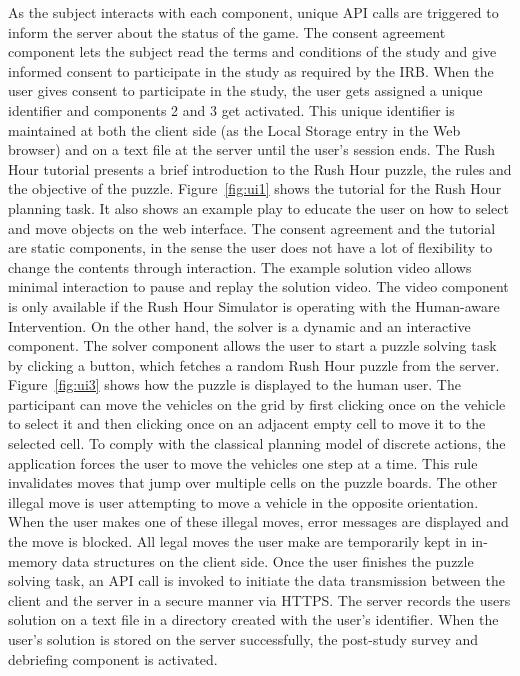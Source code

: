As the subject interacts with each component, unique API calls are triggered to inform the server about the status of the game. 
The consent agreement component lets the subject read the terms and conditions of the study and give informed consent to participate in the study as required by the IRB. 
When the user gives consent to participate in the study, the user gets assigned a unique identifier and components 2 and 3 get activated. 
This unique identifier is maintained at both the client side (as the Local Storage entry in the Web browser) and on a text file at the server until the user's session ends. 
The Rush Hour tutorial presents a brief introduction to the Rush Hour puzzle, the rules and the objective of the puzzle. 
Figure~\ref{fig:ui1} shows the tutorial for the Rush Hour planning task.
It also shows an example play to educate the user on how to select and move objects on the web interface. 
The consent agreement and the tutorial are static components, in the sense the user does not have a lot of flexibility to change the contents through interaction. 
The example solution video allows minimal interaction to pause and replay the solution video.
The video component is only available if the Rush Hour Simulator is operating with the Human-aware Intervention.
On the other hand, the solver is a dynamic and an interactive component. 
The solver component allows the user to start a puzzle solving task by clicking a button, which fetches a random Rush Hour puzzle from the server. 
Figure~\ref{fig:ui3} shows how the puzzle is displayed to the human user.
The participant can move the vehicles on the grid by first clicking once on the vehicle to select it and then clicking once on an adjacent empty cell to move it to the selected cell. To comply with the classical planning model of discrete actions, the application forces the user to move the vehicles one step at a time. 
This rule invalidates moves that jump over multiple cells on the puzzle boards. 
The other illegal move is user attempting to move a vehicle in the opposite orientation. When the user makes one of these illegal moves, error messages are displayed and the move is blocked. 
All legal moves the user make are temporarily kept in in-memory data structures on the client side. 
Once the user finishes the puzzle solving task, an API call is invoked to initiate the data transmission between the client and the server in a secure manner via HTTPS. 
The server records the users solution on a text file in a directory created with the user's identifier. 
When the user's solution is stored on the server successfully, the post-study survey and debriefing component is activated. 
